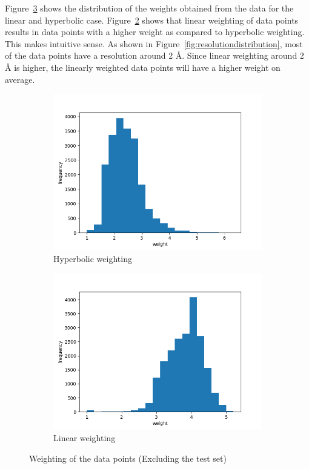 \documentclass[11pt]{article}
\begin{document}
Figure~\ref{fig:WeightDistribution} shows the distribution of the weights obtained from the data for the linear and hyperbolic case.
Figure~\ref{fig:linearweightdistribution} shows that linear weighting of data points results in data points with a higher weight as compared to hyperbolic weighting.
This makes intuitive sense. As shown in Figure~\ref{fig:resolutiondistribution}, 
most of the data points have a resolution around 2 \si{\angstrom}.
Since linear weighting around 2 \si{\angstrom} is higher, the linearly weighted data points will have a higher weight on average.

\begin{figure}
     \centering
     \begin{subfigure}[b]{0.45\textwidth}
         \centering
    \includegraphics[scale=0.5]{images/hyperbolicweightdistribution}
    \caption{Hyperbolic weighting}
    \label{fig:hyperbolicweightdistribution}
     \end{subfigure}
     \hfill
     \begin{subfigure}[b]{0.45\textwidth}
         \centering
        \includegraphics[scale=0.5]{images/linearweightdistribution}
        \caption{Linear weighting}
        \label{fig:linearweightdistribution}
     \end{subfigure}
     \caption{Weighting of the data points (Excluding the test set)}
     \label{fig:WeightDistribution}
\end{figure}
\end{document}
